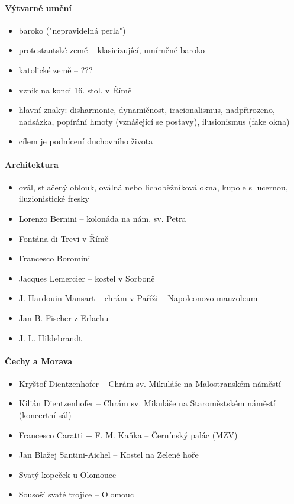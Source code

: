 \paragraph{Výtvarné umění}
\begin{itemize}
\item baroko ("nepravidelná perla")
\item protestantské země -- klasicizující, umírněné baroko
\item katolické země -- ???
\item vznik na konci 16. stol. v Římě
\item hlavní znaky: disharmonie, dynamičnost, iracionalismus, nadpřirozeno, nadsázka, popírání hmoty (vznášející se postavy), ilusionismus (fake okna)
\item cílem je podnícení duchovního života
\end{itemize}

\paragraph{Architektura}
\begin{itemize}
\item ovál, stlačený oblouk, oválná nebo lichoběžníková okna, kupole s lucernou, iluzionistické fresky
\item Lorenzo Bernini -- kolonáda na nám. sv. Petra
\item Fontána di Trevi v Římě
\item Francesco Boromini 
\item Jacques Lemercier -- kostel v Sorboně
\item J. Hardouin-Mansart -- chrám v Paříži -- Napoleonovo mauzoleum
\item Jan B. Fischer z Erlachu
\item J. L. Hildebrandt
\end{itemize}

\paragraph{Čechy a Morava}
\begin{itemize}
\item Kryštof Dientzenhofer -- Chrám sv. Mikuláše na Malostranském náměstí
\item Kilián Dientzenhofer -- Chrám sv. Mikuláše na Staroměstském náměstí (koncertní sál)
\item Francesco Caratti + F. M. Kaňka -- Černínský palác (MZV)
\item Jan Blažej Santini-Aichel -- Kostel na Zelené hoře
\item Svatý kopeček u Olomouce
\item Sousoší svaté trojice -- Olomouc
\end{itemize}

